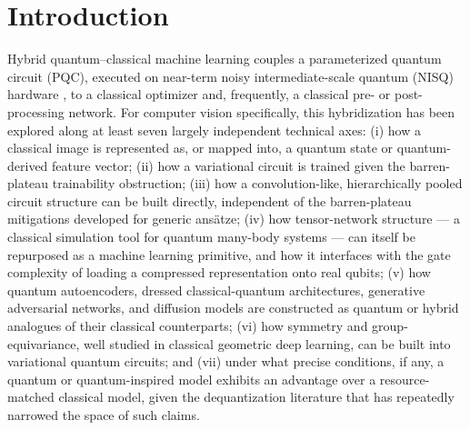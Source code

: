 \documentclass[11pt]{article}
\begin{document}
\section{Introduction}
\label{sec:intro}
Hybrid quantum--classical machine learning couples a parameterized quantum circuit (PQC), executed on near-term noisy intermediate-scale quantum (NISQ) hardware \cite{Preskill2018}, to a classical optimizer and, frequently, a classical pre- or post-processing network. For computer vision specifically, this hybridization has been explored along at least seven largely independent technical axes: (i) how a classical image is represented as, or mapped into, a quantum state or quantum-derived feature vector; (ii) how a variational circuit is trained given the barren-plateau trainability obstruction; (iii) how a convolution-like, hierarchically pooled circuit structure can be built directly, independent of the barren-plateau mitigations developed for generic ansätze; (iv) how tensor-network structure — a classical simulation tool for quantum many-body systems — can itself be repurposed as a machine learning primitive, and how it interfaces with the gate complexity of loading a compressed representation onto real qubits; (v) how quantum autoencoders, dressed classical-quantum architectures, generative adversarial networks, and diffusion models are constructed as quantum or hybrid analogues of their classical counterparts; (vi) how symmetry and group-equivariance, well studied in classical geometric deep learning, can be built into variational quantum circuits; and (vii) under what precise conditions, if any, a quantum or quantum-inspired model exhibits an advantage over a resource-matched classical model, given the dequantization literature that has repeatedly narrowed the space of such claims.
\end{document}

